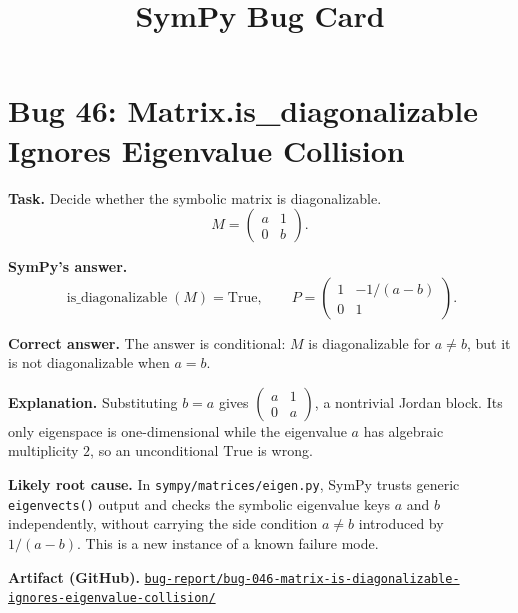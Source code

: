 \documentclass[11pt]{article}
\title{SymPy Bug Card}
\author{}
\date{}
\newcommand{\SymPy}{SymPy}
\newcommand{\artifactrepo}{https://github.com/TODO-org/TODO-repo}
\newcommand{\bugbundle}[1]{\href{\artifactrepo/tree/main/bug-report/#1}{\nolinkurl{bug-report/#1/}}}
\begin{document}
\maketitle

\section*{Bug 46: Matrix.is\_diagonalizable Ignores Eigenvalue Collision}

\begin{counterexamplebox}
\textbf{Task.} Decide whether the symbolic matrix is diagonalizable.
\[
M=\begin{pmatrix}a&1\\0&b\end{pmatrix}.
\]

\medskip
\textbf{SymPy's answer.}
\[
\operatorname{is\_diagonalizable}(M)=\mathrm{True},\qquad
P=\begin{pmatrix}1&-1/(a-b)\\0&1\end{pmatrix}.
\]

\medskip
\textbf{Correct answer.} The answer is conditional: \(M\) is diagonalizable for \(a\ne b\), but it is not diagonalizable when \(a=b\).

\medskip
\textbf{Explanation.} Substituting \(b=a\) gives \(\begin{pmatrix}a&1\\0&a\end{pmatrix}\), a nontrivial Jordan block. Its only eigenspace is one-dimensional while the eigenvalue \(a\) has algebraic multiplicity \(2\), so an unconditional \(\mathrm{True}\) is wrong.

\medskip
\textbf{Likely root cause.} In \nolinkurl{sympy/matrices/eigen.py}, \SymPy{} trusts generic \texttt{eigenvects()} output and checks the symbolic eigenvalue keys \(a\) and \(b\) independently, without carrying the side condition \(a\ne b\) introduced by \(1/(a-b)\). This is a new instance of a known failure mode.

\medskip
\textbf{Artifact (GitHub).} \bugbundle{bug-046-matrix-is-diagonalizable-ignores-eigenvalue-collision}
\end{counterexamplebox}
\end{document}
